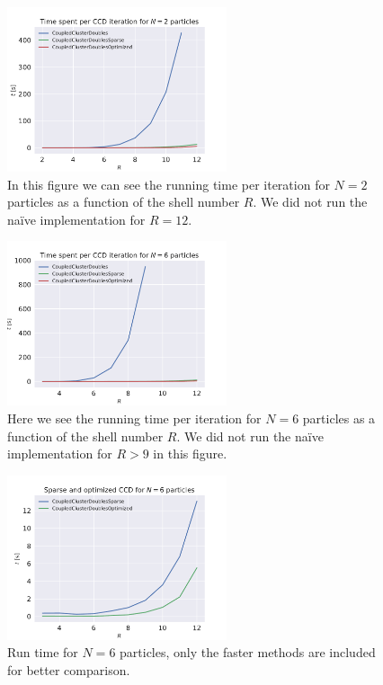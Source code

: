 \documentclass[
    a4paper, aps, twocolumn, floatfix, superscriptaddress,
    nofootinbib]{revtex4-1}
\newcommand{\1}{\mathds{1}}
\begin{document}
        \begin{figure}
            \centering
            \includegraphics[width=244px]
            {../dat/figures/iter_run_times_2.pdf}
            \caption{In this figure we can see the running time per iteration
            for $N = 2$ particles as a function of the shell number $R$. We did
            not run the naïve implementation for $R = 12$.}
            \label{fig:running_time_2}
        \end{figure}

        \begin{figure}
            \centering
            \includegraphics[width=244px]
            {../dat/figures/iter_run_times_6.pdf}
            \caption{Here we see the running time per iteration for $N = 6$
            particles as a function of the shell number $R$. We did not run the
            naïve implementation for $R > 9$ in this figure.}
            \label{fig:running_time_6}
        \end{figure}

        \begin{figure}
           \centering
            \includegraphics[width=244px]
            {../dat/figures/iter_run_times_zoom_6.pdf}
            \caption{Run time for $N=6$ particles, only the faster methods are
            included for better comparison.}
            \label{fig:running_time_6_zoom}
        \end{figure}
\end{document}
